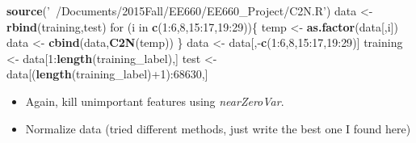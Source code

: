 \documentclass[]{article}
\newenvironment{Shaded}{\begin{snugshade}}{\end{snugshade}}
\newcommand{\KeywordTok}[1]{\textcolor[rgb]{0.13,0.29,0.53}{\textbf{{#1}}}}
\newcommand{\DataTypeTok}[1]{\textcolor[rgb]{0.13,0.29,0.53}{{#1}}}
\newcommand{\DecValTok}[1]{\textcolor[rgb]{0.00,0.00,0.81}{{#1}}}
\newcommand{\StringTok}[1]{\textcolor[rgb]{0.31,0.60,0.02}{{#1}}}
\newcommand{\OtherTok}[1]{\textcolor[rgb]{0.56,0.35,0.01}{{#1}}}
\newcommand{\NormalTok}[1]{{#1}}
\begin{document}
\begin{Shaded}
\begin{Highlighting}[]
\KeywordTok{source}\NormalTok{(}\StringTok{'~/Documents/2015Fall/EE660/EE660_Project/C2N.R'}\NormalTok{)}
\NormalTok{data <-}\StringTok{ }\KeywordTok{rbind}\NormalTok{(training,test)}
\NormalTok{for (i in }\KeywordTok{c}\NormalTok{(}\DecValTok{1}\NormalTok{:}\DecValTok{6}\NormalTok{,}\DecValTok{8}\NormalTok{,}\DecValTok{15}\NormalTok{:}\DecValTok{17}\NormalTok{,}\DecValTok{19}\NormalTok{:}\DecValTok{29}\NormalTok{))\{}
    \NormalTok{temp <-}\StringTok{ }\KeywordTok{as.factor}\NormalTok{(data[,i])}
    \NormalTok{data <-}\StringTok{ }\KeywordTok{cbind}\NormalTok{(data,}\KeywordTok{C2N}\NormalTok{(temp))}
\NormalTok{\}}
\NormalTok{data <-}\StringTok{ }\NormalTok{data[,-}\KeywordTok{c}\NormalTok{(}\DecValTok{1}\NormalTok{:}\DecValTok{6}\NormalTok{,}\DecValTok{8}\NormalTok{,}\DecValTok{15}\NormalTok{:}\DecValTok{17}\NormalTok{,}\DecValTok{19}\NormalTok{:}\DecValTok{29}\NormalTok{)]}
\NormalTok{training <-}\StringTok{ }\NormalTok{data[}\DecValTok{1}\NormalTok{:}\KeywordTok{length}\NormalTok{(training_label),]}
\NormalTok{test <-}\StringTok{ }\NormalTok{data[(}\KeywordTok{length}\NormalTok{(training_label)+}\DecValTok{1}\NormalTok{):}\DecValTok{68630}\NormalTok{,]}
\end{Highlighting}
\end{Shaded}

\begin{itemize}
\itemsep1pt\parskip0pt
\item
  Again, kill unimportant features using \emph{nearZeroVar}.
\end{itemize}

\begin{Shaded}
\end{Shaded}

\begin{itemize}
\itemsep1pt\parskip0pt
\item
  Normalize data (tried different methods, just write the best one I
  found here)
\end{itemize}
\end{document}
